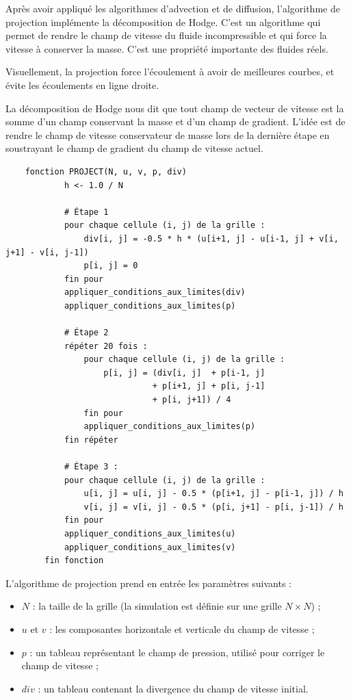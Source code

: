 \documentclass[a4paper]{article}
\begin{document}
\hspace*{\parindent} Après avoir appliqué les algorithmes d'advection et de diffusion, l'algorithme 
    de projection implémente la décomposition de Hodge.
    C'est un algorithme qui permet de rendre le champ de vitesse du fluide incompressible et qui force la vitesse à conserver la masse. C'est une propriété importante des fluides réels. 

Visuellement, la projection force l'écoulement à avoir de meilleures courbes, et évite les écoulements en ligne droite. 

La décomposition de Hodge nous dit que tout champ de vecteur de vitesse est la somme d'un champ conservant la masse et d'un champ de gradient. L'idée est de rendre le champ de vitesse conservateur de masse lors de la dernière étape en soustrayant le champ de gradient du champ de vitesse actuel.


\begin{verbatim}
    fonction PROJECT(N, u, v, p, div)
            h <- 1.0 / N

            # Étape 1
            pour chaque cellule (i, j) de la grille :
                div[i, j] = -0.5 * h * (u[i+1, j] - u[i-1, j] + v[i, j+1] - v[i, j-1])
                p[i, j] = 0
            fin pour
            appliquer_conditions_aux_limites(div)
            appliquer_conditions_aux_limites(p)

            # Étape 2
            répéter 20 fois :
                pour chaque cellule (i, j) de la grille : 
                    p[i, j] = (div[i, j]  + p[i-1, j] 
                              + p[i+1, j] + p[i, j-1] 
                              + p[i, j+1]) / 4
                fin pour
                appliquer_conditions_aux_limites(p)
            fin répéter

            # Étape 3 :
            pour chaque cellule (i, j) de la grille :
                u[i, j] = u[i, j] - 0.5 * (p[i+1, j] - p[i-1, j]) / h
                v[i, j] = v[i, j] - 0.5 * (p[i, j+1] - p[i, j-1]) / h
            fin pour
            appliquer_conditions_aux_limites(u)
            appliquer_conditions_aux_limites(v)
        fin fonction
\end{verbatim}



L'algorithme de projection prend en entrée les paramètres suivants :
\begin{itemize}
    \item $N$ : la taille de la grille (la simulation est définie sur une grille $N \times N$) ;
    \item $u$ et $v$ : les composantes horizontale et verticale du champ de vitesse ;
    \item $p$ : un tableau représentant le champ de pression, utilisé pour corriger le champ de vitesse ;
    \item $div$ : un tableau contenant la divergence du champ de vitesse initial.\\
\end{itemize}
\end{document}
